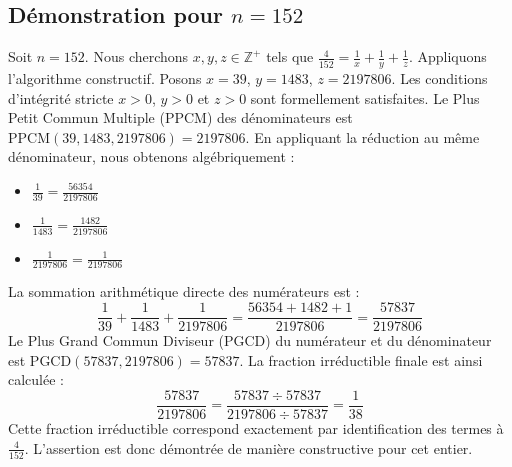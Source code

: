 \documentclass[11pt,a4paper]{article}
\begin{document}
\subsection{Démonstration pour $n = 152$}
Soit $n = 152$. Nous cherchons $x, y, z \in \mathbb{Z}^{+}$ tels que $\frac{4}{152} = \frac{1}{x} + \frac{1}{y} + \frac{1}{z}$.
Appliquons l'algorithme constructif. Posons $x = 39$, $y = 1483$, $z = 2197806$.
Les conditions d'intégrité stricte $x > 0$, $y > 0$ et $z > 0$ sont formellement satisfaites.
Le Plus Petit Commun Multiple (PPCM) des dénominateurs est $\text{PPCM}(39, 1483, 2197806) = 2197806$.
En appliquant la réduction au même dénominateur, nous obtenons algébriquement :
\begin{itemize}
    \item $\frac{1}{39} = \frac{56354}{2197806}$
    \item $\frac{1}{1483} = \frac{1482}{2197806}$
    \item $\frac{1}{2197806} = \frac{1}{2197806}$
\end{itemize}
La sommation arithmétique directe des numérateurs est :
$$ \frac{1}{39} + \frac{1}{1483} + \frac{1}{2197806} = \frac{56354 + 1482 + 1}{2197806} = \frac{57837}{2197806} $$
Le Plus Grand Commun Diviseur (PGCD) du numérateur et du dénominateur est $\text{PGCD}(57837, 2197806) = 57837$.
La fraction irréductible finale est ainsi calculée :
$$ \frac{57837}{2197806} = \frac{57837 \div 57837}{2197806 \div 57837} = \frac{1}{38} $$
Cette fraction irréductible correspond exactement par identification des termes à $\frac{4}{152}$. L'assertion est donc démontrée de manière constructive pour cet entier.
\end{document}
